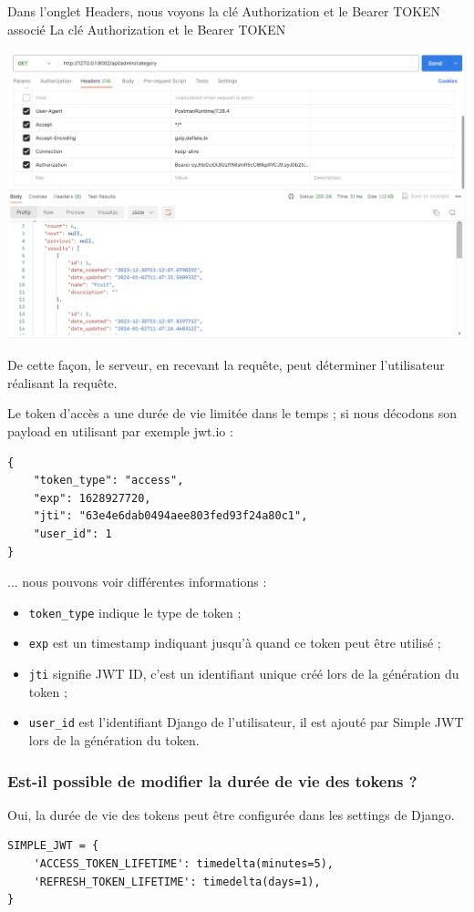 Dans l’onglet Headers, nous voyons la clé Authorization et le Bearer TOKEN associé
La clé Authorization et le Bearer TOKEN
\begin{center}
\includegraphics[width=15cm]{images/image25.png}
\end{center}

De cette façon, le serveur, en recevant la requête, peut déterminer l’utilisateur réalisant la requête.

Le token d’accès a une durée de vie {\color{monOrange}limitée dans le temps} ; si nous décodons son payload en utilisant par exemple jwt.io :
\begin{verbatim}
{
    "token_type": "access",
    "exp": 1628927720,
    "jti": "63e4e6dab0494aee803fed93f24a80c1",
    "user_id": 1
}
\end{verbatim}

... nous pouvons voir différentes informations :
\begin{itemize}
\item {\tt token\_type}  indique le type de token ;
\item {\tt exp}  est un timestamp indiquant jusqu’à quand ce token peut être utilisé ;
\item {\tt jti}  signifie JWT ID, c’est un identifiant unique créé lors de la génération du token ;
\item {\tt user\_id}  est l’identifiant Django de l’utilisateur, il est ajouté par Simple JWT lors de la génération du token.
\end{itemize}

\subsubsection*{Est-il possible de modifier la durée de vie des tokens ?}
Oui, la durée de vie des tokens peut être configurée dans les settings de Django.
\begin{verbatim}
SIMPLE_JWT = {
    'ACCESS_TOKEN_LIFETIME': timedelta(minutes=5),
    'REFRESH_TOKEN_LIFETIME': timedelta(days=1),
}
\end{verbatim}

